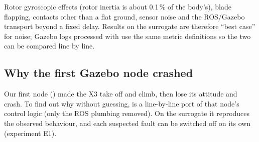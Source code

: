\begin{warn}
Rotor gyroscopic effects (rotor inertia is about 0.1\,\% of the body's), blade flapping, contacts other than a flat ground,
sensor noise and the ROS/Gazebo transport beyond a fixed delay. Results on the surrogate are therefore ``best case'' for
noise; Gazebo logs processed with  use the same metric definitions so the two can be compared
line by line.
\end{warn}

\subsection{Why the first Gazebo node crashed}
\label{sec:x3fault}

Our first node () made the X3 take off and climb, then lose its attitude and crash. To find out
why without guessing,  is a line-by-line port of that node's control logic (only the ROS
plumbing removed). On the surrogate it reproduces the observed behaviour, and each suspected fault can be switched off on
its own (experiment E1).

